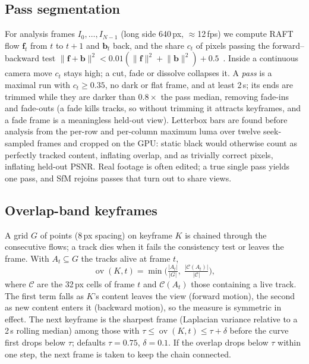 \documentclass[10pt,a4paper,twocolumn]{article}
\newcommand{\ov}{\operatorname{ov}}
\begin{document}
\subsection{Pass segmentation}
For analysis frames $I_0,\dots,I_{N-1}$ (long side 640\,px, $\approx$12\,fps) we compute RAFT flow $\mathbf{f}_t$ from $t$ to $t{+}1$ and $\mathbf{b}_t$ back, and the share $c_t$ of pixels passing the forward--backward test $\lVert\mathbf{f}+\mathbf{b}\rVert^2 < 0.01(\lVert\mathbf{f}\rVert^2+\lVert\mathbf{b}\rVert^2)+0.5$~\cite{sundaram2010tracks}. Inside a continuous camera move $c_t$ stays high; a cut, fade or dissolve collapses it. A \emph{pass} is a maximal run with $c_t \ge 0.35$, no dark or flat frame, and at least 2\,s; its ends are trimmed while they are darker than $0.8\times$ the pass median, removing fade-ins and fade-outs (a fade kills tracks, so without trimming it attracts keyframes, and a fade frame is a meaningless held-out view). Letterbox bars are found before analysis from the per-row and per-column maximum luma over twelve seek-sampled frames and cropped on the GPU: static black would otherwise count as perfectly tracked content, inflating overlap, and as trivially correct pixels, inflating held-out PSNR. Real footage is often edited; a true single pass yields one pass, and SfM rejoins passes that turn out to share views.

\subsection{Overlap-band keyframes}\label{sec:keyframes}
A grid $G$ of points (8\,px spacing) on keyframe $K$ is chained through the consecutive flows; a track dies when it fails the consistency test or leaves the frame. With $A_t\subseteq G$ the tracks alive at frame $t$,
\begin{equation}
\ov(K,t) = \min\Big(\tfrac{|A_t|}{|G|},\; \tfrac{|\mathcal{C}(A_t)|}{|\mathcal{C}|}\Big),
\end{equation}
where $\mathcal{C}$ are the 32\,px cells of frame $t$ and $\mathcal{C}(A_t)$ those containing a live track. The first term falls as $K$'s content leaves the view (forward motion), the second as new content enters it (backward motion), so the measure is symmetric in effect. The next keyframe is the sharpest frame (Laplacian variance relative to a 2\,s rolling median) among those with $\tau\le\ov(K,t)\le\tau+\delta$ before the curve first drops below $\tau$; defaults $\tau=0.75$, $\delta=0.1$. If the overlap drops below $\tau$ within one step, the next frame is taken to keep the chain connected.
\end{document}
